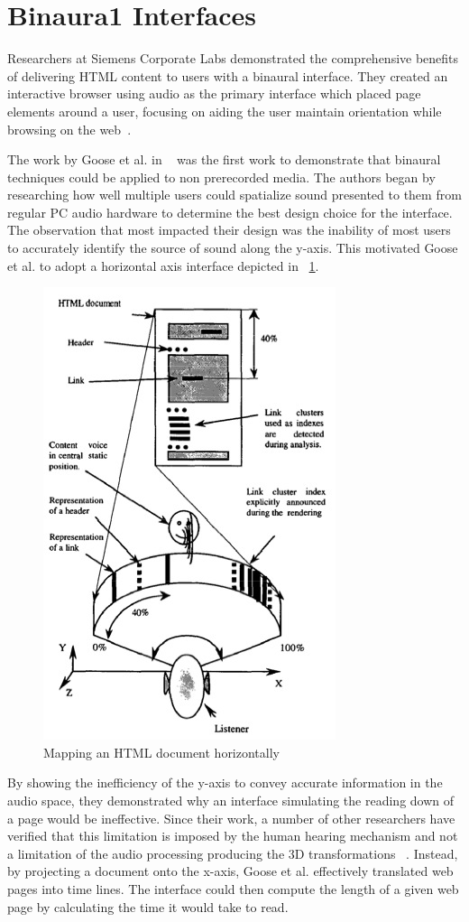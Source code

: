 \section{                  Binaura1 Interfaces                                }

Researchers at Siemens Corporate Labs demonstrated the comprehensive benefits
of delivering HTML content to users with a binaural interface.  They created
an interactive browser using audio as the primary interface which placed page
elements around a user, focusing on aiding the user maintain orientation while
browsing on the web~\cite{goose19993dAudio}.

The work by Goose et al. in ~\cite{goose19993dAudio} was the first work to
demonstrate that binaural techniques could be applied to non prerecorded media.
The authors began by researching how well multiple users could spatialize sound
presented to them from regular PC audio hardware to determine the best design
choice for the interface. The observation that most impacted their design was
the inability of most users to accurately identify the source of sound along
the y-axis.  This motivated Goose et al. to adopt a horizontal axis interface
depicted in ~\ref{fig:goose_horizon}.

\begin{figure}[t]
    \centering
    \includegraphics[width=.4\linewidth]{images/goose_horizon.jpg}
    \caption{Mapping an HTML document horizontally}
    \label{fig:goose_horizon}
\end{figure}


By showing the inefficiency of the y-axis to convey accurate information in the
audio space, they demonstrated why an interface simulating the reading down of
a page would be ineffective. Since their work, a number of other researchers have
verified that this limitation is imposed by the human hearing mechanism and not
a limitation of the audio processing producing the 3D transformations
~\cite{song2010personal, gardner19983, marentakis2004study}. Instead, by
projecting a document onto the x-axis, Goose et al. effectively translated web
pages into time lines.  The interface could then compute the length of a given
web page by calculating the time it would take to read.

